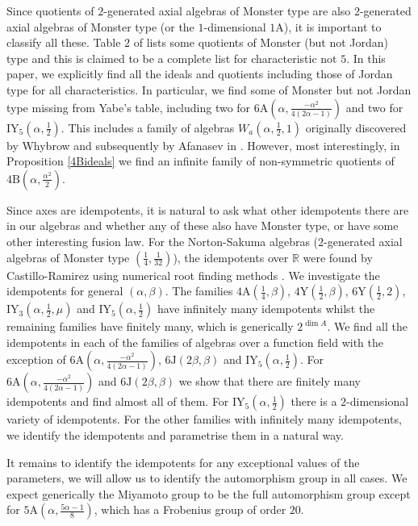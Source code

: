 \documentclass[11pt, a4paper]{article}
\theoremstyle{plain}
\theoremstyle{definition}
\newcommand\al{\alpha}
\newcommand\bt{\beta}
\newcommand\R{\mathbb{R}}
\newcommand{\A}{\mathrm{A}}
\newcommand{\B}{\mathrm{B}}
\newcommand{\J}{\mathrm{J}}
\newcommand{\Y}{\mathrm{Y}}
\newcommand{\IY}{\mathrm{IY}}
\newcommand{\0}{\overline{0}}
\newcommand{\2}{\overline{2}}
\newcommand{\1}{\mathbbm{1}}
\begin{document}
Since quotients of $2$-generated axial algebras of Monster type are also $2$-generated axial algebras of Monster type (or the $1$-dimensional $1\A$), it is important to classify all these.  Table $2$ of \cite{yabe} lists some quotients of Monster (but not Jordan) type and this is claimed to be a complete list for characteristic not $5$.  In this paper, we explicitly find all the ideals and quotients including those of Jordan type for all characteristics.  In particular, we find some of Monster but not Jordan type missing from Yabe's table, including two for $6\A(\al, \frac{-\al^2}{4(2\al-1)})$ and two for $\IY_5(\al, \frac{1}{2})$.  This includes a family of algebras $W_a(\al, \frac{1}{2},1)$ originally discovered by Whybrow \cite[Theorem 5.6]{whybrowgraded} and subsequently by Afanasev in \cite{axial3evals}.  However, most interestingly, in Proposition \ref{4Bideals} we find an infinite family of non-symmetric quotients of $4\B(\al, \frac{\al^2}{2})$.

Since axes are idempotents, it is natural to ask what other idempotents there are in our algebras and whether any of these also have Monster type, or have some other interesting fusion law.  For the Norton-Sakuma algebras ($2$-generated axial algebras of Monster type $(\frac{1}{4}, \frac{1}{32})$), the idempotents over $\R$ were found by Castillo-Ramirez using numerical root finding methods \cite{Alonsoidempotents}.  We investigate the idempotents for general $(\al, \bt)$.  The families $4\A(\frac{1}{4}, \bt)$, $4\Y(\frac{1}{2}, \bt)$, $6\Y(\frac{1}{2}, 2)$, $\IY_3(\al, \frac{1}{2}, \mu)$ and $\IY_5(\al, \frac{1}{2})$ have infinitely many idempotents whilst the remaining families have finitely many, which is generically $2^{\dim A}$.  We find all the idempotents in each of the families of algebras over a function field with the exception of $6\A(\al, \frac{-\al^2}{4(2\al-1)})$, $6\J(2\bt, \bt)$ and $\IY_5(\al, \frac{1}{2})$.  For $6\A(\al, \frac{-\al^2}{4(2\al-1)})$ and $6\J(2\bt, \bt)$ we show that there are finitely many idempotents and find almost all of them.  For $\IY_5(\al, \frac{1}{2})$ there is a $2$-dimensional variety of idempotents.  For the other families with infinitely many idempotents, we identify the idempotents and parametrise them in a natural way.

It remains to identify the idempotents for any exceptional values of the parameters, we will allow us to identify the automorphism group in all cases.  We expect generically the Miyamoto group to be the full automorphism group except for $5\A(\al, \frac{5\al-1}{8})$, which has a Frobenius group of order $20$.
\end{document}
